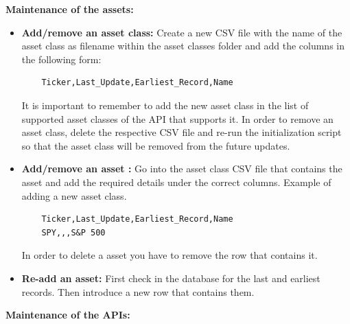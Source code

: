 \documentclass[main.tex]{subfiles}
\begin{document}
\textbf{Maintenance of the assets:}
\begin{itemize}
    \item \textbf{Add/remove an asset class:} Create a new CSV file with the name of the asset class as filename within the asset classes folder and add the columns in the following form:\newline
    \begin{lstlisting}
    Ticker,Last_Update,Earliest_Record,Name
    \end{lstlisting}
    It is important to remember to add the new asset class in the list of supported asset classes of the API that supports it.\newline
    In order to remove an asset class, delete the respective CSV file and re-run the initialization script so that the asset class will be removed from the future updates. 
    \item \textbf{Add/remove an asset : } Go into the asset class CSV file that contains the asset and add the required details under the correct columns.
    Example of adding a new asset class.
    \begin{lstlisting}
    Ticker,Last_Update,Earliest_Record,Name
    SPY,,,S&P 500
    \end{lstlisting}
    In order to delete a asset you have to remove the row that contains it.
    
    \item \textbf{Re-add an asset: } First check in the database for the last and earliest records. Then introduce a new row that contains them. 
\end{itemize}

\textbf{Maintenance of the APIs:}
\end{document}
